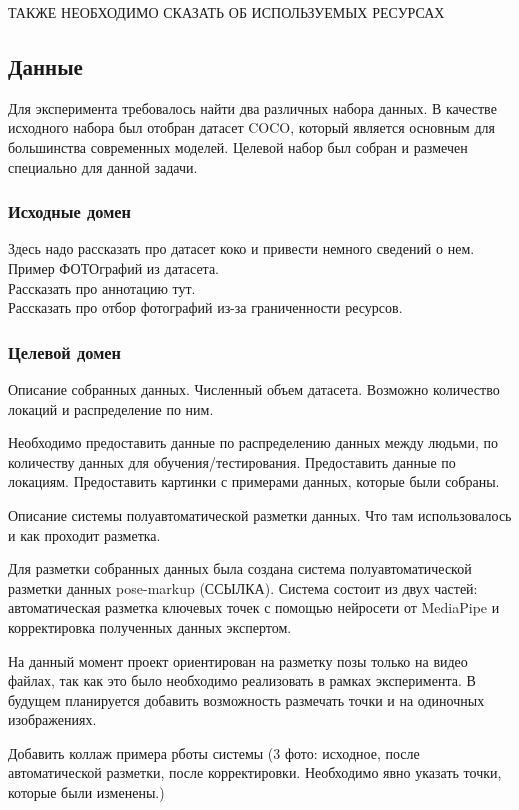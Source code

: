 ТАКЖЕ НЕОБХОДИМО СКАЗАТЬ ОБ ИСПОЛЬЗУЕМЫХ РЕСУРСАХ

\subsection{Данные}

Для эксперимента требовалось найти два различных набора данных. В качестве исходного набора был отобран датасет COCO, который является основным для большинства современных моделей. Целевой набор был собран и размечен специально для данной задачи.

\subsubsection{Исходные домен}

Здесь надо рассказать про датасет коко и привести немного сведений о нем.\\
Пример ФОТОграфий из датасета.\\
Рассказать про аннотацию тут.\\
Рассказать про отбор фотографий из-за граниченности ресурсов.

\subsubsection{Целевой домен}

Описание собранных данных. Численный объем датасета. Возможно количество локаций и распределение по ним.

Необходимо предоставить данные по распределению данных между людьми, по количеству данных для обучения/тестирования. Предоставить данные по локациям. Предоставить картинки с примерами данных, которые были собраны.

Описание системы полуавтоматической разметки данных. Что там использовалось и как проходит разметка.

Для разметки собранных данных была создана система полуавтоматической разметки данных pose-markup (ССЫЛКА). Система состоит из двух частей: автоматическая разметка ключевых точек с помощью нейросети от MediaPipe и корректировка полученных данных экспертом.

На данный момент проект ориентирован на разметку позы только на видео файлах, так как это было необходимо реализовать в рамках эксперимента. В будущем планируется добавить возможность размечать точки и на одиночных изображениях.

Добавить коллаж примера рботы системы (3 фото: исходное, после автоматической разметки, после корректировки. Необходимо явно указать точки, которые были изменены.)

